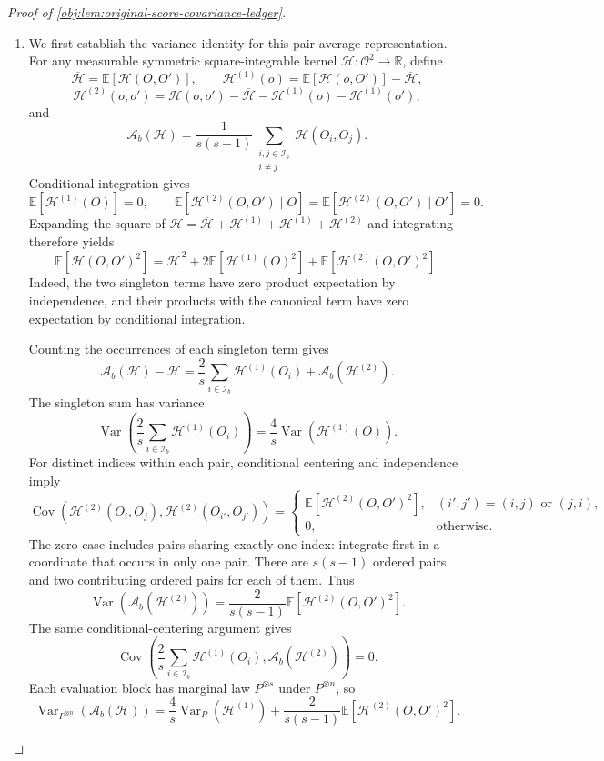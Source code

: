 \documentclass[11pt]{article}
\begin{document}
\begin{proof}[Proof of \cref{obj:lem:original-score-covariance-ledger}]
\begin{enumerate}
\item We first establish the variance identity for this pair-average representation. For any measurable symmetric square-integrable kernel
\(\mathscr H:\mathcal O^2\to\mathbb R\), define
\[
\overline{\mathscr H}=\mathbb E[\mathscr H(O,O')],
\qquad
\mathscr H^{(1)}(o)
=
\mathbb E[\mathscr H(o,O')]-\overline{\mathscr H},
\]
\[
\mathscr H^{(2)}(o,o')
=
\mathscr H(o,o')
-\overline{\mathscr H}
-\mathscr H^{(1)}(o)
-\mathscr H^{(1)}(o'),
\]
and
\[
\mathscr A_b(\mathscr H)
=
\frac1{s(s-1)}
\sum_{\substack{i,j\in\mathcal I_b\\i\ne j}}
\mathscr H(O_i,O_j).
\]
Conditional integration gives
\[
\mathbb E[\mathscr H^{(1)}(O)]=0,
\qquad
\mathbb E[\mathscr H^{(2)}(O,O')\mid O]
=
\mathbb E[\mathscr H^{(2)}(O,O')\mid O']
=
0.
\]
Expanding the square of
\(\mathscr H=\overline{\mathscr H}+\mathscr H^{(1)}+\mathscr H^{(1)}+\mathscr H^{(2)}\)
and integrating therefore yields
\[
\mathbb E[\mathscr H(O,O')^2]
=
\overline{\mathscr H}^{\,2}
+
2\mathbb E[\mathscr H^{(1)}(O)^2]
+
\mathbb E[\mathscr H^{(2)}(O,O')^2].
\]
Indeed, the two singleton terms have zero product expectation by independence, and their products with the canonical term have zero expectation by conditional integration.

Counting the occurrences of each singleton term gives
\[
\mathscr A_b(\mathscr H)-\overline{\mathscr H}
=
\frac2s\sum_{i\in\mathcal I_b}\mathscr H^{(1)}(O_i)
+
\mathscr A_b(\mathscr H^{(2)}).
\]
The singleton sum has variance
\[
\operatorname{Var}\!\left(
\frac2s\sum_{i\in\mathcal I_b}\mathscr H^{(1)}(O_i)
\right)
=
\frac4s\operatorname{Var}(\mathscr H^{(1)}(O)).
\]
For distinct indices within each pair, conditional centering and independence imply
\[
\operatorname{Cov}\!\left(
\mathscr H^{(2)}(O_i,O_j),
\mathscr H^{(2)}(O_{i'},O_{j'})
\right)
=
\begin{cases}
\mathbb E[\mathscr H^{(2)}(O,O')^2],
&(i',j')=(i,j)\text{ or }(j,i),\\
0,&\text{otherwise}.
\end{cases}
\]
The zero case includes pairs sharing exactly one index: integrate first in a coordinate that occurs in only one pair. There are \(s(s-1)\) ordered pairs and two contributing ordered pairs for each of them. Thus
\[
\operatorname{Var}(\mathscr A_b(\mathscr H^{(2)}))
=
\frac{2}{s(s-1)}
\mathbb E[\mathscr H^{(2)}(O,O')^2].
\]
The same conditional-centering argument gives
\[
\operatorname{Cov}\!\left(
\frac2s\sum_{i\in\mathcal I_b}\mathscr H^{(1)}(O_i),
\mathscr A_b(\mathscr H^{(2)})
\right)=0.
\]
Each evaluation block has marginal law \(P^{\otimes s}\) under \(P^{\otimes n}\), so
\[
\operatorname{Var}_{P^{\otimes n}}(\mathscr A_b(\mathscr H))
=
\frac4s\operatorname{Var}_P(\mathscr H^{(1)})
+
\frac{2}{s(s-1)}
\mathbb E[\mathscr H^{(2)}(O,O')^2].
\]


\end{enumerate}
\end{proof}
\end{document}
